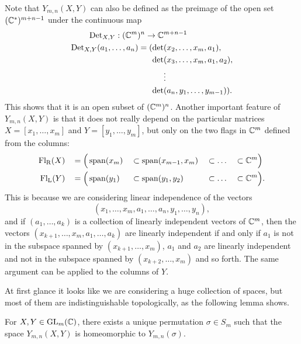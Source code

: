 Note that $Y_{m,n}(X,Y)$ can also be defined as the
preimage of the open set $(\mathbb{C}^*)^{m+n-1}$ under the continuous map
\begin{align*}
  \operatorname{Det}_{X,Y} : (\mathbb{C}^m)^n \to \mathbb{C}&^{m+n-1} \\
  \operatorname{Det}_{X,Y}(a_1,\dots,a_n) = (\det&(x_2,\dots,x_m,a_1),\\
                               \det&(x_3,\dots,x_m,a_1,a_2), \\
                               &\vdots\\
                               \det&(a_n,y_1,\dots,y_{m-1})).
\end{align*}
This shows that it is an open subset of $(\mathbb{C}^m)^n$. Another important
feature of $Y_{m,n}(X,Y)$ is that it does not really depend on the
particular matrices $X = [x_1,\dots,x_m]$ and $Y = [y_1,\dots,y_m]$,
but
only on the two flags in $\mathbb{C}^{m}$ 
defined from the columns: 
\begin{alignat*}{5}
  \mathrm{Fl_R}(X)\, &&= \Big(&\operatorname{span}(x_m) &&\subset \operatorname{span}(x_{m-1},x_m) &&\subset
    \dots &&\subset \mathbb{C}^m\Big) \\
  \mathrm{Fl_L}(Y)\, &&= \Big(&\operatorname{span}(y_1) &&\subset \operatorname{span}(y_1,y_2) &&\subset
    \dots &&\subset \mathbb{C}^m\Big).
\end{alignat*}
This is because we are considering linear independence of the vectors
\[ (x_1,\dots,x_m,a_1,\dots,a_n,y_1,\dots,y_n), \]
and if $(a_1,\dots,a_{k})$ is a collection of linearly independent
vectors of $\mathbb{C}^m$, then the vectors
$(x_{k+1},\dots,x_m,a_1,\dots,a_{k})$ are
linearly independent if and only if $a_1$ is not in the subspace
spanned by $(x_{k+1},\dots,x_m)$, $a_1$ and $a_2$ are linearly
independent and not in the
subspace spanned by $(x_{k+2},\dots,x_m)$ and so forth. The same
argument can be applied to the columns of $Y$.

At first glance it looks like we are considering a huge collection of
spaces, but most of them are indistinguishable topologically, as the
following lemma shows.

\begin{lemma} \label{lem:rum-perm}
  For $X,Y\in \mathrm{GL}_m(\mathbb{C})$, there exists a unique permutation $\sigma
  \in S_m$  such that the space
  $Y_{m,n}(X,Y)$ is homeomorphic to $Y_{m,n}(\sigma)$.
\end{lemma}

